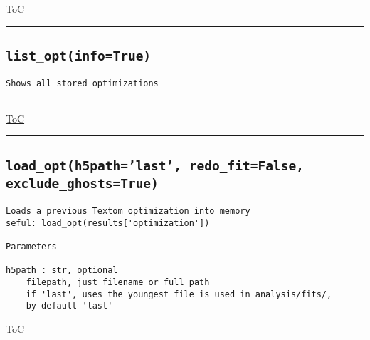 \documentclass{article}
\begin{document}
\begin{flushright}

\hyperref[toc]{ToC}

\end{flushright}



\vspace{5mm}

\hrule

\subsection*{\texttt{list\_opt(info=True)}}
\label{fun:listopt}

\begin{lstlisting}[language=docstring]
Shows all stored optimizations
    
\end{lstlisting}

\begin{flushright}

\hyperref[toc]{ToC}

\end{flushright}



\vspace{5mm}

\hrule

\subsection*{\texttt{load\_opt(h5path='last', redo\_fit=False, exclude\_ghosts=True)}}
\label{fun:loadopt}

\begin{lstlisting}[language=docstring]
Loads a previous Textom optimization into memory
seful: load_opt(results['optimization'])

Parameters
----------
h5path : str, optional
    filepath, just filename or full path
    if 'last', uses the youngest file is used in analysis/fits/, 
    by default 'last'
\end{lstlisting}

\begin{flushright}

\hyperref[toc]{ToC}

\end{flushright}
\end{document}
